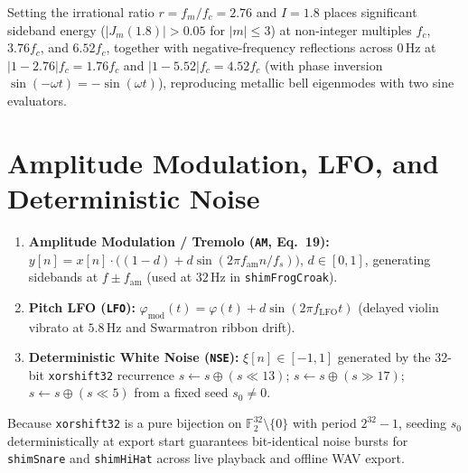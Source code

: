 \begin{corollary}
Setting the irrational ratio $r = f_m/f_c = 2.76$ and $I = 1.8$ places significant sideband energy ($|J_m(1.8)| > 0.05$ for $|m| \le 3$) at non-integer multiples $f_c$, $3.76 f_c$, and $6.52 f_c$, together with negative-frequency reflections across $0\,\text{Hz}$ at $|1 - 2.76|f_c = 1.76 f_c$ and $|1 - 5.52|f_c = 4.52 f_c$ (with phase inversion $\sin(-\omega t) = -\sin(\omega t)$), reproducing metallic bell eigenmodes with two sine evaluators.
\end{corollary}

\section{Amplitude Modulation, LFO, and Deterministic Noise}

\begin{definition}
\begin{enumerate}[leftmargin=1.5em]
  \item \textbf{Amplitude Modulation / Tremolo (\texttt{AM}, Eq.~19):} $y[n] = x[n]\cdot\big((1-d) + d\sin(2\pi f_{\mathrm{am}} n / f_s)\big)$, $d \in [0, 1]$, generating sidebands at $f \pm f_{\mathrm{am}}$ (used at $32\,\text{Hz}$ in \texttt{shimFrogCroak}).
  \item \textbf{Pitch LFO (\texttt{LFO}):} $\varphi_{\mathrm{mod}}(t) = \varphi(t) + d\sin(2\pi f_{\mathrm{LFO}} t)$ (delayed violin vibrato at $5.8\,\text{Hz}$ and Swarmatron ribbon drift).
  \item \textbf{Deterministic White Noise (\texttt{NSE}):} $\xi[n] \in [-1, 1]$ generated by the 32-bit \texttt{xorshift32} recurrence $s \leftarrow s \oplus (s \ll 13)$; $s \leftarrow s \oplus (s \gg 17)$; $s \leftarrow s \oplus (s \ll 5)$ from a fixed seed $s_0 \ne 0$.
\end{enumerate}
\end{definition}

\begin{proposition}
Because \texttt{xorshift32} is a pure bijection on $\mathbb{F}_2^{32} \setminus \{0\}$ with period $2^{32}-1$, seeding $s_0$ deterministically at export start guarantees bit-identical noise bursts for \texttt{shimSnare} and \texttt{shimHiHat} across live playback and offline WAV export.
\end{proposition}

